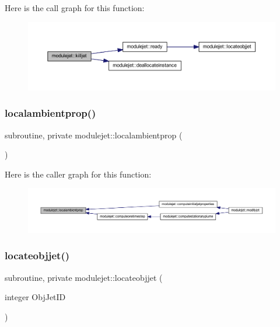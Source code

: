 Here is the call graph for this function\+:\nopagebreak
\begin{figure}[H]
\begin{center}
\leavevmode
\includegraphics[width=350pt]{namespacemodulejet_a98749a91e325a4b4041aa46d5abfde4e_cgraph}
\end{center}
\end{figure}
\mbox{\label{namespacemodulejet_a1eea8311f846796ccfa34a65730c5c55}} 
\subsubsection{\texorpdfstring{localambientprop()}{localambientprop()}}
{\footnotesize\ttfamily subroutine, private modulejet\+::localambientprop (\begin{DoxyParamCaption}{ }\end{DoxyParamCaption})\hspace{0.3cm}{\ttfamily [private]}}

Here is the caller graph for this function\+:\nopagebreak
\begin{figure}[H]
\begin{center}
\leavevmode
\includegraphics[width=350pt]{namespacemodulejet_a1eea8311f846796ccfa34a65730c5c55_icgraph}
\end{center}
\end{figure}
\mbox{\label{namespacemodulejet_a0b2668a76b18f69741deda8796740f8f}} 
\subsubsection{\texorpdfstring{locateobjjet()}{locateobjjet()}}
{\footnotesize\ttfamily subroutine, private modulejet\+::locateobjjet (\begin{DoxyParamCaption}\item[{integer}]{Obj\+Jet\+ID }\end{DoxyParamCaption})\hspace{0.3cm}{\ttfamily [private]}}

